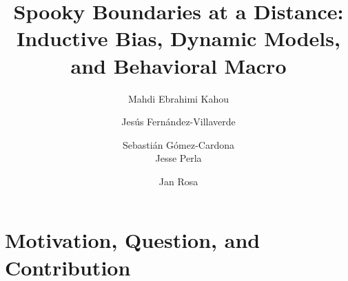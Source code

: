 \documentclass[aspectratio=169,10pt]{beamer}
\begin{document}
\title{{\vspace{0.4in}\hspace{0.2in}\textcolor{PennBlue}{Spooky Boundaries at a Distance: \\ \hspace*{5 mm}Inductive Bias, Dynamic Models, and Behavioral Macro}}}
\author{\hspace*{4 mm} Mahdi Ebrahimi Kahou\and
	Jes\'{u}s Fern\'{a}ndez-Villaverde \and Sebasti\'an G\'omez-Cardona \\ \hspace*{4 mm}  Jesse Perla \and Jan Rosa}



\date{}

\maketitle

\section{\textcolor{PennBlue}{Motivation, Question, and Contribution}}
\end{document}
